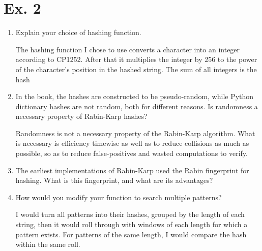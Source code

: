\documentclass{article}
\begin{document}
\section{Ex. 2}
\begin{enumerate}
    \item Explain your choice of hashing function.  
    
    The hashing function I chose to use converts a character into an integer according to CP1252. After that it multiplies the integer by 256 to the power of the character's position in the hashed string. The sum of all integers is the hash
    
    \item In the book, the hashes are constructed to be pseudo-random, while Python dictionary hashes are not random, both for different reasons. Is randomness a necessary property of Rabin-Karp hashes?
    
    Randomness is not a necessary property of the Rabin-Karp algorithm. What is necessary is efficiency timewise as well as to reduce collisions as much as possible, so as to reduce false-positives and wasted computations to verify.
    
    \item The earliest implementations of Rabin-Karp used the Rabin fingerprint for hashing. What is this fingerprint, and what are its advantages?
    
    
    
    \item How would you modify your function to search multiple patterns? 

    I would turn all patterns into their hashes, grouped by the length of each string, then it would roll through with windows of each length for which a pattern exists. For patterns of the same length, I would compare the hash within the same roll.

\end{enumerate}
\end{document}
